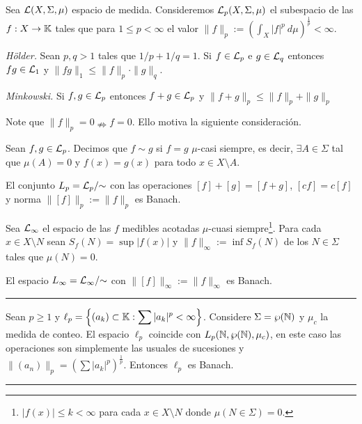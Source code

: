 \begin{definition}
    Sea \(\mathcal{L}(X,\Sigma,\mu)\) espacio de medida. Consideremos \(\mathcal{L}_p(X,\Sigma,\mu)\) el subespacio de las \(f:X\rightarrow\mathbb{K}\) tales que para \(1\leq p<\infty \) el valor \(\|f\|_p := \displaystyle \left(\int_X |f|^p\ d\mu\right)^{\frac{1}{p}}< \infty \). 
\end{definition}
\begin{theorem}
    \emph{Hölder.} Sean \(p,q>1\) tales que \(1/p + 1/q = 1\). Si \(f\in \mathcal{L}_p\) e \(g\in \mathcal{L}_q\) entonces \(fg\in \mathcal{L}_1\) y \(\|fg\|_1\leq \|f\|_p\cdot\|g\|_q\).  
\end{theorem}
\begin{theorem}
    \emph{Minkowski.} Si \(f,g\in \mathcal{L}_p\) entonces \(f+g\in \mathcal{L}_p\) y \(\|f+g\|_p\leq \|f\|_p+\|g\|_p\) 
\end{theorem}
\begin{note}
    Note que \(\|f\|_p = 0 \nRightarrow f=0\). Ello motiva la siguiente consideración.  
\end{note}
\begin{definition}
    Sean \(f,g\in \mathcal{L}_p\). Decimos que \(f\sim g\) si \(f=g\) \(\mu\)-casi siempre, es decir, \(\exists A\in \Sigma \) tal que \(\mu(A)=0\) y \(f(x)=g(x)\) para todo \(x\in X\setminus A\). 
\end{definition}
\begin{theorem}
    El conjunto \(L_p = \Li_p/\hspace{-0.1cm}\sim\) con las operaciones \([f]+[g] = [f+g]\), \([cf]=c[f]\) y norma \(\|[f]\|_p := \|f\|_p\) es Banach. 
\end{theorem}
\begin{definition}
    Sea \(\mathcal{L}_\infty\) el espacio de las \(f\) medibles acotadas \(\mu\)-cuasi siempre\footnote{\(|f(x)|\leq k < \infty\) para cada \(x\in X\setminus N\) donde \(\mu(N\in \Sigma)=0\).}. Para cada \(x\in X\setminus N\) sean \(S_f(N) = \sup|f(x)|\) y \(\|f\|_\infty:= \inf S_f(N)\) de los \(N\in \Sigma\) tales que \(\mu(N) = 0\). 
\end{definition}
\begin{theorem}
    El espacio \(L_\infty = \Li_\infty/\hspace{-0.1cm}\sim \) con \(\|[f]\|_\infty := \|f\|_\infty\) es Banach. 
\end{theorem}

\E

\hrule 
\begin{example}
    Sean \(p\geq 1\) y \(\ell_p = \left\{(a_k)\subset \mathbb{K} : \displaystyle \sum |a_k|^p < \infty\right\}\). Considere \(\Sigma = \wp(\mathbb{N})\) y \(\mu_c\) la medida de conteo. El espacio \(\ell_p\) coincide con \(L_p(\mathbb{N},\wp(\mathbb{N}), \mu_c)\), en este caso las operaciones son simplemente las usuales de sucesiones y \(\displaystyle \|(a_n)\|_p = \left(\sum |a_k|^p\right)^{\frac{1}{p}}\). Entonces \(\ell_p\) es Banach.
\end{example}
\hrule 

